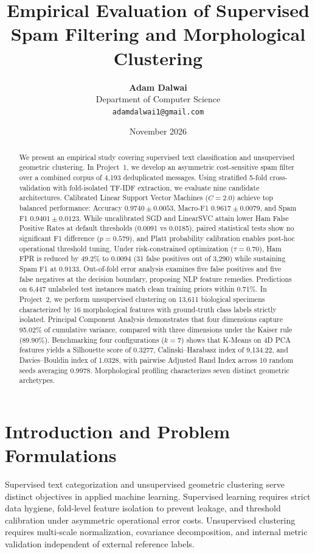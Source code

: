 \documentclass[10pt,onecolumn,letterpaper]{article}
\title{\vspace{-0.3in}\textbf{\Large Empirical Evaluation of Supervised Spam Filtering and Morphological Clustering}\vspace{-0.08in}}
\author{\textbf{Adam Dalwai} \\ Department of Computer Science \\ \texttt{adamdalwai1@gmail.com}}
\date{\vspace{-0.15in}\small November 2026\vspace{-0.1in}}
\begin{document}
\maketitle

\begin{abstract}
\noindent We present an empirical study covering supervised text classification and unsupervised geometric clustering. In Project~1, we develop an asymmetric cost-sensitive spam filter over a combined corpus of 4,193 deduplicated messages. Using stratified 5-fold cross-validation with fold-isolated TF-IDF extraction, we evaluate nine candidate architectures. Calibrated Linear Support Vector Machines ($C=2.0$) achieve top balanced performance: Accuracy $0.9740 \pm 0.0053$, Macro-F1 $0.9617 \pm 0.0079$, and Spam F1 $0.9401 \pm 0.0123$. While uncalibrated SGD and LinearSVC attain lower Ham False Positive Rates at default thresholds (0.0091 vs 0.0185), paired statistical tests show no significant F1 difference ($p=0.579$), and Platt probability calibration enables post-hoc operational threshold tuning. Under risk-constrained optimization ($\tau=0.70$), Ham FPR is reduced by 49.2\% to 0.0094 (31 false positives out of 3,290) while sustaining Spam F1 at 0.9133. Out-of-fold error analysis examines five false positives and five false negatives at the decision boundary, proposing NLP feature remedies. Predictions on 6,447 unlabeled test instances match clean training priors within 0.71\%. In Project~2, we perform unsupervised clustering on 13,611 biological specimens characterized by 16 morphological features with ground-truth class labels strictly isolated. Principal Component Analysis demonstrates that four dimensions capture 95.02\% of cumulative variance, compared with three dimensions under the Kaiser rule (89.90\%). Benchmarking four configurations ($k=7$) shows that K-Means on 4D PCA features yields a Silhouette score of 0.3277, Calinski--Harabasz index of 9,134.22, and Davies--Bouldin index of 1.0328, with pairwise Adjusted Rand Index across 10 random seeds averaging 0.9978. Morphological profiling characterizes seven distinct geometric archetypes.
\end{abstract}

\section{Introduction and Problem Formulations}
Supervised text categorization and unsupervised geometric clustering serve distinct objectives in applied machine learning. Supervised learning requires strict data hygiene, fold-level feature isolation to prevent leakage, and threshold calibration under asymmetric operational error costs. Unsupervised clustering requires multi-scale normalization, covariance decomposition, and internal metric validation independent of external reference labels.
\end{document}
